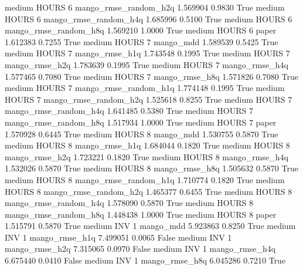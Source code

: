     medium    HOURS                 6 mango_rmse_random_h2q   1.569904      0.9830    True
    medium    HOURS                 6 mango_rmse_random_h4q   1.685996      0.5100    True
    medium    HOURS                 6 mango_rmse_random_h8q   1.569210      1.0000    True
    medium    HOURS                 6                 paper   1.612383      0.7255    True
    medium    HOURS                 7             mango_mdd   1.589539      0.5425    True
    medium    HOURS                 7        mango_rmse_h1q   1.743548      0.1995    True
    medium    HOURS                 7        mango_rmse_h2q   1.783639      0.1995    True
    medium    HOURS                 7        mango_rmse_h4q   1.577465      0.7080    True
    medium    HOURS                 7        mango_rmse_h8q   1.571826      0.7080    True
    medium    HOURS                 7 mango_rmse_random_h1q   1.774148      0.1995    True
    medium    HOURS                 7 mango_rmse_random_h2q   1.525618      0.8255    True
    medium    HOURS                 7 mango_rmse_random_h4q   1.641485      0.5380    True
    medium    HOURS                 7 mango_rmse_random_h8q   1.517934      1.0000    True
    medium    HOURS                 7                 paper   1.570928      0.6445    True
    medium    HOURS                 8             mango_mdd   1.530755      0.5870    True
    medium    HOURS                 8        mango_rmse_h1q   1.684044      0.1820    True
    medium    HOURS                 8        mango_rmse_h2q   1.723221      0.1820    True
    medium    HOURS                 8        mango_rmse_h4q   1.532026      0.5870    True
    medium    HOURS                 8        mango_rmse_h8q   1.505632      0.5870    True
    medium    HOURS                 8 mango_rmse_random_h1q   1.710774      0.1820    True
    medium    HOURS                 8 mango_rmse_random_h2q   1.465377      0.6455    True
    medium    HOURS                 8 mango_rmse_random_h4q   1.578090      0.5870    True
    medium    HOURS                 8 mango_rmse_random_h8q   1.448438      1.0000    True
    medium    HOURS                 8                 paper   1.515791      0.5870    True
    medium      INV                 1             mango_mdd   5.923863      0.8250    True
    medium      INV                 1        mango_rmse_h1q   7.499051      0.0065   False
    medium      INV                 1        mango_rmse_h2q   7.315065      0.0970   False
    medium      INV                 1        mango_rmse_h4q   6.675440      0.0410   False
    medium      INV                 1        mango_rmse_h8q   6.045286      0.7210    True
